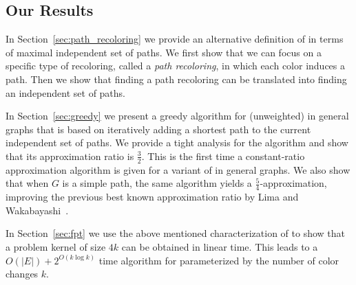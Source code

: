 \subsection{Our Results}
In Section~\ref{sec:path_recoloring} we provide an alternative definition of \TWOCR{}
in terms of maximal independent set of paths.
%
We first show that we can focus on a specific type of recoloring,
called a \emph{path recoloring},
in which each color induces a path.
%
Then we show that finding a path recoloring can be translated 
into finding an independent set of paths.

In Section~\ref{sec:greedy} we present a greedy algorithm for (unweighted) \TWOCR{} 
in general graphs that is based on iteratively
adding a shortest path to the current independent set of paths.
%
We provide a tight analysis for the algorithm and show
that its approximation ratio is $\frac{3}{2}$.
%
This is the first time a constant-ratio approximation algorithm is given for a variant of
\CRP{} in general graphs.
%
We also show that when $G$ is a simple path, 
the same algorithm yields a $\frac{5}{4}$-approximation, 
improving the previous best known approximation ratio by 
Lima and Wakabayashi~\cite{lima2014convex}.

In Section~\ref{sec:fpt} we use the above mentioned characterization
of \TWOCR{} to show that a problem kernel of size $4k$ can be obtained in linear time.
%
This leads to a $O(|E|) + 2^{O(k \log k)}$ time algorithm for \TWOCR{} 
parameterized by the number of color changes $k$.